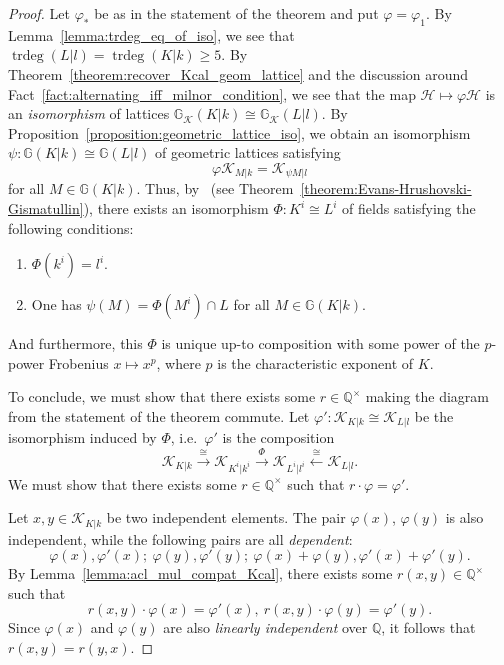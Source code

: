 \documentclass[12pt]{amsart}
\newcommand{\Qbb}{\mathbb{Q}}
\newcommand{\Gbb}{\mathbb{G}}
\newcommand{\trdeg}{\operatorname{trdeg}}
\newcommand{\Hcal}{\mathcal{H}}
\newcommand{\Kcal}{\mathcal{K}}
\renewcommand{\phi}{\varphi}
\theoremstyle{definition}
\begin{document}
\begin{proof}
  Let $\phi_{*}$ be as in the statement of the theorem and put $\phi = \phi_{1}$.
  By Lemma~\ref{lemma:trdeg_eq_of_iso}, we see that $\trdeg(L|l) = \trdeg(K|k) \geq 5$.
  By Theorem~\ref{theorem:recover_Kcal_geom_lattice} and the discussion around Fact~\ref{fact:alternating_iff_milnor_condition}, we see that the map $\Hcal \mapsto \phi \Hcal$ is an \emph{isomorphism} of lattices $\Gbb_{\Kcal}(K|k) \cong \Gbb_{\Kcal}(L|l)$.
  By Proposition~\ref{proposition:geometric_lattice_iso}, we obtain an isomorphism $\psi : \Gbb(K|k) \cong \Gbb(L|l)$ of geometric lattices satisfying
  \[ \phi \Kcal_{M|k} = \Kcal_{\psi M|l} \]
  for all $M \in \Gbb(K|k)$.
  Thus, by~\cite[theorem 4.2]{zbMATH05350217} (see Theorem~\ref{theorem:Evans-Hrushovski-Gismatullin}), there exists an isomorphism $\Phi : K^{i} \cong L^{i}$ of fields satisfying the following conditions:
  \begin{enumerate}
    \item $\Phi(k^{i}) = l^{i}$.
    \item One has $\psi(M) = \Phi(M^{i}) \cap L$ for all $M \in \Gbb(K|k)$.
  \end{enumerate}
  And furthermore, this $\Phi$ is unique up-to composition with some power of the $p$-power Frobenius $x \mapsto x^{p}$, where $p$ is the characteristic exponent of $K$.

  To conclude, we must show that there exists some $r \in \Qbb^{\times}$ making the diagram from the statement of the theorem commute.
  Let $\phi' : \Kcal_{K|k} \cong \Kcal_{L|l}$ be the isomorphism induced by $\Phi$, i.e.~$\phi'$ is the composition
  \[ \Kcal_{K|k} \xrightarrow{\cong} \Kcal_{K^{i}|k^{i}} \xrightarrow{\Phi} \Kcal_{L^{i}|l^{i}} \xleftarrow{\cong} \Kcal_{L|l}. \]
  We must show that there exists some $r \in \Qbb^{\times}$ such that $r \cdot \phi = \phi'$.

  Let $x,y \in \Kcal_{K|k}$ be two independent elements.
  The pair $\phi(x)$, $\phi(y)$ is also independent, while the following pairs are all \emph{dependent}:
  \[ \phi(x),\phi'(x); \ \phi(y),\phi'(y); \ \phi(x) + \phi(y),\phi'(x)+\phi'(y). \]
  By Lemma~\ref{lemma:acl_mul_compat_Kcal}, there exists some $r(x,y) \in \Qbb^{\times}$ such that
  \[ r(x,y) \cdot \phi(x) = \phi'(x), \ r(x,y) \cdot \phi(y) = \phi'(y). \]
  Since $\phi(x)$ and $\phi(y)$ are also \emph{linearly independent} over $\Qbb$, it follows that $r(x,y) = r(y,x)$.


\end{proof}
\end{document}
